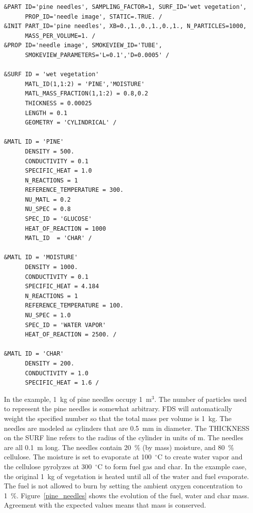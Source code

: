 \documentclass[11pt]{book}
\begin{document}
\begin{lstlisting}
&PART ID='pine needles', SAMPLING_FACTOR=1, SURF_ID='wet vegetation',
      PROP_ID='needle image', STATIC=.TRUE. /
&INIT PART_ID='pine needles', XB=0.,1.,0.,1.,0.,1., N_PARTICLES=1000,
      MASS_PER_VOLUME=1. /
&PROP ID='needle image', SMOKEVIEW_ID='TUBE',
      SMOKEVIEW_PARAMETERS='L=0.1','D=0.0005' /

&SURF ID = 'wet vegetation'
      MATL_ID(1,1:2) = 'PINE','MOISTURE'
      MATL_MASS_FRACTION(1,1:2) = 0.8,0.2
      THICKNESS = 0.00025
      LENGTH = 0.1
      GEOMETRY = 'CYLINDRICAL' /

&MATL ID = 'PINE'
      DENSITY = 500.
      CONDUCTIVITY = 0.1
      SPECIFIC_HEAT = 1.0
      N_REACTIONS = 1
      REFERENCE_TEMPERATURE = 300.
      NU_MATL = 0.2
      NU_SPEC = 0.8
      SPEC_ID = 'GLUCOSE'
      HEAT_OF_REACTION = 1000
      MATL_ID  = 'CHAR' /

&MATL ID = 'MOISTURE'
      DENSITY = 1000.
      CONDUCTIVITY = 0.1
      SPECIFIC_HEAT = 4.184
      N_REACTIONS = 1
      REFERENCE_TEMPERATURE = 100.
      NU_SPEC = 1.0
      SPEC_ID = 'WATER VAPOR'
      HEAT_OF_REACTION = 2500. /

&MATL ID = 'CHAR'
      DENSITY = 200.
      CONDUCTIVITY = 1.0
      SPECIFIC_HEAT = 1.6 /
\end{lstlisting}
In the example, 1~kg of pine needles occupy 1~m$^3$. The number of particles used to represent the pine needles is somewhat arbitrary. FDS will automatically weight the specified number so that the total mass per volume is 1~kg. The needles are modeled as cylinders that are 0.5~mm in diameter. The {\ct THICKNESS} on the {\ct SURF} line refers to the radius of the cylinder in units of m. The needles are all 0.1~m long. The needles contain 20~\% (by mass) moisture, and 80~\% cellulose. The moisture is set to evaporate at 100~$^\circ$C to create water vapor and the cellulose pyrolyzes at 300~$^\circ$C to form fuel gas and char. In the example case, the original 1~kg of vegetation is heated until all of the water and fuel evaporate. The fuel is not allowed to burn by setting the ambient oxygen concentration to 1~\%. Figure~\ref{pine_needles} shows the evolution of the fuel, water and char mass. Agreement with the expected values means that mass is conserved.
\end{document}
